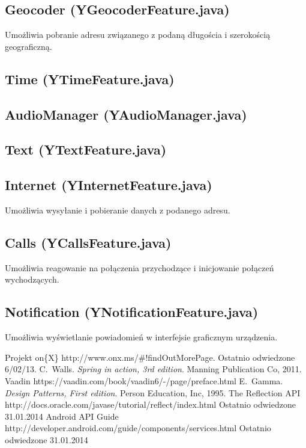 \documentclass[11pt,a4paper,polish,thesis]{dcsbook}
\begin{document}
\subsection{Geocoder (YGeocoderFeature.java)}
Umożliwia pobranie adresu związanego z podaną długościa i szerokością geograficzną.

\subsection{Time (YTimeFeature.java)}

\subsection{AudioManager (YAudioManager.java)}

\subsection{Text (YTextFeature.java)}

\subsection{Internet (YInternetFeature.java)}
Umożliwia wysyłanie i pobieranie danych z podanego adresu.

\subsection{Calls (YCallsFeature.java)}
Umożliwia reagowanie na połączenia przychodzące i inicjowanie połączeń wychodzących.

\subsection{Notification (YNotificationFeature.java)}
Umożliwia wyświetlanie powiadomień w interfejsie graficznym urządzenia.

\backmatter

\begin{thebibliography}{1}
Projekt on\{X\} http://www.onx.ms/\#!findOutMorePage. Ostatnio odwiedzone 6/02/13.
C.~Walls. \emph{Spring in action, 3rd edition}. Manning Publication Co, 2011.
Vaadin https://vaadin.com/book/vaadin6/-/page/preface.html 
E.~Gamma. \emph{Design Patterns, First edition}. Person Education, Inc, 1995.
The Reflection API  http://docs.oracle.com/javase/tutorial/reflect/index.html Ostatnio odwiedzone 31.01.2014
 Android API Guide http://developer.android.com/guide/components/services.html Ostatnio odwiedzone 31.01.2014
\end{thebibliography}
\end{document}
